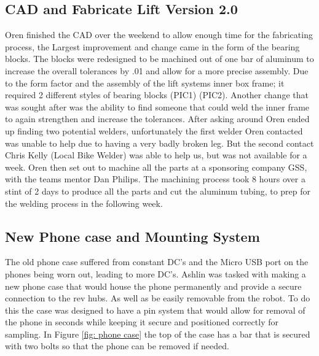 \documentclass{article}
\begin{document}
\subsection{CAD and Fabricate Lift Version 2.0}
Oren finished the CAD over the weekend to allow enough time for the fabricating process, the Largest improvement and change came in the form of the bearing blocks. The blocks were redesigned to be machined out of one bar of aluminum to increase the overall tolerances by .01 and allow for a more precise assembly. Due to the form factor and the assembly of the lift systems inner box frame; it required 2 different styles of bearing blocks (PIC1) (PIC2). Another change that was sought after was the ability to find someone that could weld the inner frame to again strengthen and increase the tolerances. After asking around Oren ended up finding two potential welders, unfortunately the first welder Oren contacted was unable to help due to having a very badly broken leg. But the second contact Chris Kelly (Local Bike Welder) was able to help us, but was not available for a week. Oren then set out to machine all the parts at a sponsoring company GSS, with the teams mentor Dan Philips. The machining process took 8 hours over a stint of 2 days to produce all the parts and cut the aluminum tubing, to prep for the welding process in the following week. 

\subsection{New Phone case and  Mounting System}
The old phone case suffered from constant DC's and the Micro USB port on the phones being worn out, leading to more DC's. Ashlin was tasked with making a new phone case that would house the phone permanently and provide a secure connection to the rev hubs. As well as be easily removable from the robot. To do this the case was designed to have a pin system that would allow for removal of the phone in seconds while keeping it secure and positioned correctly for sampling. In Figure \ref{fig: phone case} the top of the case has a bar that is secured with two bolts so that the phone can be removed if needed.
\end{document}
